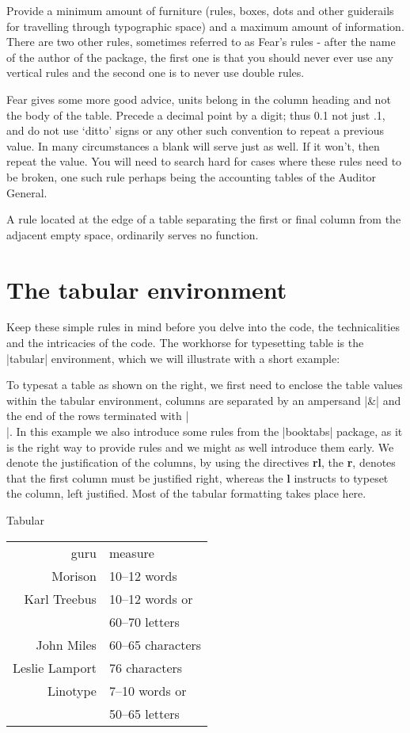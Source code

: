 Provide a minimum amount of furniture (rules, boxes, dots and other guiderails for travelling through typographic space) and a maximum amount of information. There are two other rules, sometimes referred to as Fear's rules - after the name of the author of the  package, the first one is that you should never ever use any vertical rules and the second one is to never use double rules\cite{booktabs}.


 Fear gives some more good advice,   units belong in the column heading and not the body of the table. Precede a decimal point by a digit; thus 0.1 not just .1, and do not use `ditto' signs or any other such convention to repeat a previous value. In many circumstances a blank will serve just as well. If it won't,
then repeat the value. You will need to search hard for cases where these rules need to be broken, one such rule perhaps being the accounting tables of the Auditor General. 

A rule located at the edge of a table separating the first or final column from the adjacent empty space, ordinarily serves no function.


\section{The tabular environment}

Keep these simple rules in mind before you delve into the code, the technicalities and the intricacies of the code. The \latex workhorse for typesetting table is the |tabular| environment, which we will illustrate with a short example:

To typesat a  table as shown on the right, we first need to enclose the table values within the tabular environment, columns are separated by an ampersand |&| and the end of the rows terminated with |\\|.
In this example we also introduce some rules from the |booktabs| package, as it is the right way to provide rules and we might as well introduce them early. We denote the justification of the columns, by using the directives \textbf{rl}, the \textbf{r}, denotes that the first column must be justified right, whereas the \textbf{l} instructs \latex to typeset the column, left justified. Most of the tabular formatting takes place here.

\begin{texexample}{Tabular}{}{}
\begin{tabular}{rl}
\toprule
guru 			& measure \\
Morison      & 10--12 words \\
Karl Treebus & 10--12 words or\\
             & 60--70 letters \\
John Miles   & 60--65 characters \\
Leslie Lamport & 76 characters \\
Linotype       & 7--10 words or\\
& 50--65 letters\\
\bottomrule
\end{tabular} 
\end{texexample}


